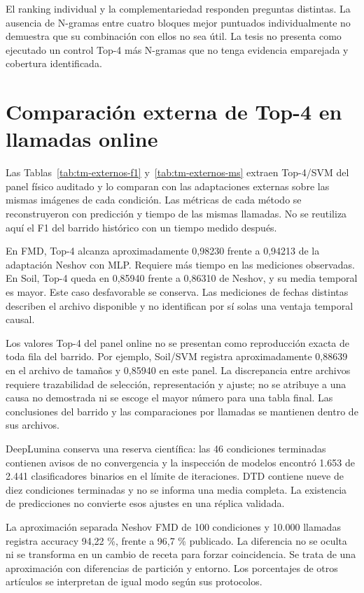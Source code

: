 El ranking individual y la complementariedad responden preguntas distintas. La ausencia de N-gramas entre cuatro bloques mejor puntuados individualmente no demuestra que su combinación con ellos no sea útil. La tesis no presenta como ejecutado un control Top-4 más N-gramas que no tenga evidencia emparejada y cobertura identificada.

\section{Comparación externa de Top-4 en llamadas online}\label{sec:resultados-panel-online-sota}
Las Tablas~\ref{tab:tm-externos-f1} y~\ref{tab:tm-externos-ms} extraen Top-4/SVM del panel físico auditado y lo comparan con las adaptaciones externas sobre las mismas imágenes de cada condición. Las métricas de cada método se reconstruyeron con predicción y tiempo de las mismas llamadas. No se reutiliza aquí el F1 del barrido histórico con un tiempo medido después.




En FMD, Top-4 alcanza aproximadamente 0,98230 frente a 0,94213 de la adaptación Neshov con MLP. Requiere más tiempo en las mediciones observadas. En Soil, Top-4 queda en 0,85940 frente a 0,86310 de Neshov, y su media temporal es mayor. Este caso desfavorable se conserva. Las mediciones de fechas distintas describen el archivo disponible y no identifican por sí solas una ventaja temporal causal.

Los valores Top-4 del panel online no se presentan como reproducción exacta de toda fila del barrido. Por ejemplo, Soil/SVM registra aproximadamente 0,88639 en el archivo de tamaños y 0,85940 en este panel. La discrepancia entre archivos requiere trazabilidad de selección, representación y ajuste; no se atribuye a una causa no demostrada ni se escoge el mayor número para una tabla final. Las conclusiones del barrido y las comparaciones por llamadas se mantienen dentro de sus archivos.

DeepLumina conserva una reserva científica: las 46 condiciones terminadas contienen avisos de no convergencia y la inspección de modelos encontró 1.653 de 2.441 clasificadores binarios en el límite de iteraciones. DTD contiene nueve de diez condiciones terminadas y no se informa una media completa. La existencia de predicciones no convierte esos ajustes en una réplica validada.

La aproximación separada Neshov FMD de 100 condiciones y 10.000 llamadas registra accuracy 94,22 \%, frente a 96,7 \% publicado. La diferencia no se oculta ni se transforma en un cambio de receta para forzar coincidencia. Se trata de una aproximación con diferencias de partición y entorno. Los porcentajes de otros artículos se interpretan de igual modo según sus protocolos.

